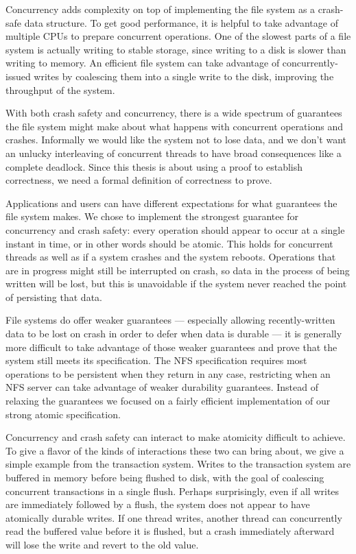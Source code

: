 Concurrency adds complexity on top of implementing the file system as a
crash-safe data structure. To get good performance, it is helpful to take
advantage of multiple CPUs to prepare concurrent operations. One of the slowest
parts of a file system is actually writing to stable storage, since writing to a
disk is slower than writing to memory. An efficient file system can take
advantage of concurrently-issued writes by coalescing them into a single write
to the disk, improving the throughput of the system.

With both crash safety and concurrency, there is a wide spectrum of guarantees
the file system might make about what happens with concurrent operations and
crashes. Informally we would like the system not to lose data, and we don't want
an unlucky interleaving of concurrent threads to have broad consequences like a
complete deadlock. Since this thesis is about using a proof to establish
correctness, we need a formal definition of correctness to prove.

Applications and users can have different expectations for what guarantees the
file system makes. We chose to implement the strongest guarantee for concurrency
and crash safety: every operation should appear to occur at a single instant in
time, or in other words should be atomic. This holds for concurrent threads as
well as if a system crashes and the system reboots. Operations that are in
progress might still be interrupted on crash, so data in the process of being
written will be lost, but this is unavoidable if the system never reached the
point of persisting that data.

File systems do offer weaker guarantees --- especially allowing recently-written
data to be lost on crash in order to defer when data is
durable --- it is generally more difficult to take
advantage of those weaker guarantees and prove that the system still meets its
specification. The NFS specification requires most operations to be persistent
when they return in any case, restricting when an NFS server can take advantage
of weaker durability guarantees. Instead of relaxing the guarantees we focused
on a fairly efficient implementation of our strong atomic specification.

Concurrency and crash safety can interact to make atomicity difficult to
achieve. To give a flavor of the kinds of interactions these two can bring
about, we give a simple example from the transaction system. Writes to the
transaction system are buffered in memory before being flushed to disk, with the
goal of coalescing concurrent transactions in a single flush. Perhaps
surprisingly, even if all writes are immediately followed by a flush, the system
does not appear to have atomically durable writes. If one thread writes, another
thread can concurrently read the buffered value before it is flushed, but a
crash immediately afterward will lose the write and revert to the old value.

